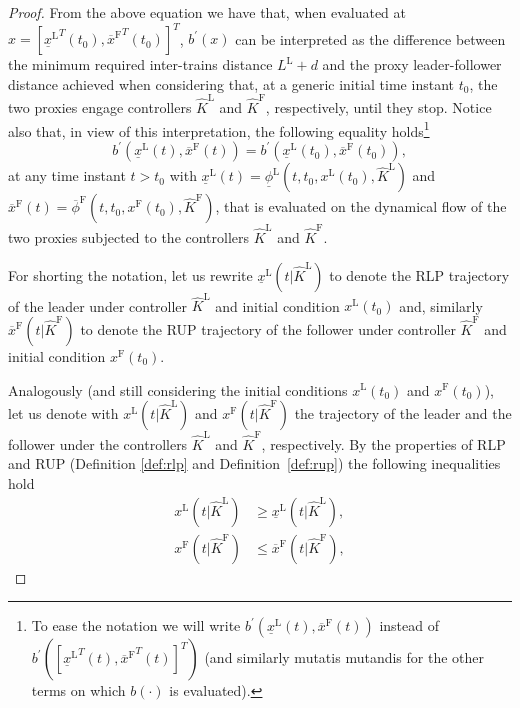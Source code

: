\documentclass[letterpaper, 10 pt, conference]{ieeeconf}
\newcounter{Definition}
\theoremstyle{definition}
\theoremstyle{nopoint}
\newcommand{\tildeAdd}{~}
\begin{document}
\begin{proof}
	From the above equation we have that, when evaluated at $x=[{\underline{x}^\mathrm{L}}^T(t_0),{\overline{x}^\mathrm{F}}^T(t_0)]^T$,  $b^\prime(x)$ can be interpreted as the difference between the minimum required inter-trains distance $L^\mathrm{L}+d$ and the proxy leader-follower distance achieved when considering that, at a generic initial time instant $t_0$, the two proxies engage controllers $\hat{K}^\mathrm{L}$ and $\hat{K}^\mathrm{F}$, respectively, until they stop. 
	Notice also that, in view of this interpretation, the following equality holds\footnote{To ease the notation we will write $b^\prime(\underline{x}^\mathrm{L}(t),\overline{x}^\mathrm{F}(t))$ instead of $b^\prime([{\underline{x}^\mathrm{L}}^T(t),{\overline{x}^\mathrm{F}}^T(t)]^T)$ (and similarly mutatis mutandis for the other terms on which $b(\cdot)$ is evaluated).}
	\begin{equation}\label{eq:constantb_prime}
		b^\prime(\underline{x}^\mathrm{L}(t),\overline{x}^\mathrm{F}(t))=b^\prime(\underline{x}^\mathrm{L}(t_0),\overline{x}^\mathrm{F}(t_0)),
	\end{equation}
	at any time instant $t>t_0$ with  $\underline{x}^\mathrm{L}(t)=\underline{\phi}^\mathrm{L}(t,t_0,x^\mathrm{L}(t_0),\hat{K}^\mathrm{L})$ and $\overline{x}^\mathrm{F}(t)=\overline{\phi}^\mathrm{F}(t,t_0,x^\mathrm{F}(t_0),\hat{K}^\mathrm{F})$, that is evaluated on the dynamical flow of the two proxies subjected to the controllers $\hat{K}^\mathrm{L}$ and $\hat{K}^\mathrm{F}$.
	
	For shorting the notation, let us rewrite $\underline{x}^\mathrm{L}(t | \hat{K}^\mathrm{L})$ to denote the RLP trajectory of the leader under controller $\hat{K}^\mathrm{L}$ and initial condition $x^\mathrm{L}(t_0)$ and, similarly  $\overline{x}^\mathrm{F}(t | \hat{K}^\mathrm{F})$ to denote the RUP trajectory of the follower under controller $\hat{K}^\mathrm{F}$ and initial condition $x^\mathrm{F}(t_0)$. 
	
	
	Analogously (and still considering the initial conditions $x^\mathrm{L}(t_0)$ and $x^\mathrm{F}(t_0)$), let us denote with $x^\mathrm{L}(t | \hat{K}^\mathrm{L})$  and $x^\mathrm{F}(t | \hat{K}^\mathrm{F})$ the trajectory of the leader and the follower under the controllers $\hat{K}^\mathrm{L}$ and $\hat{K}^\mathrm{F}$, respectively.
	By the properties of RLP and RUP (Definition \ref{def:rlp} and Definition\tildeAdd\ref{def:rup}) the following inequalities hold
	\begin{subequations}\label{eq:inequality1}
		\begin{align}
			x^\mathrm{L}(t | \hat{K}^\mathrm{L}) &\geq \underline{x}^\mathrm{L}(t | \hat{K}^\mathrm{L}), \label{eq:inequality1_leader}\\
			x^\mathrm{F}(t | \hat{K}^\mathrm{F}) &\leq \overline{x}^\mathrm{F}(t | \hat{K}^\mathrm{F}),\label{eq:inequality1_follower}
		\end{align}
	\end{subequations}
	

\end{proof}
\end{document}
